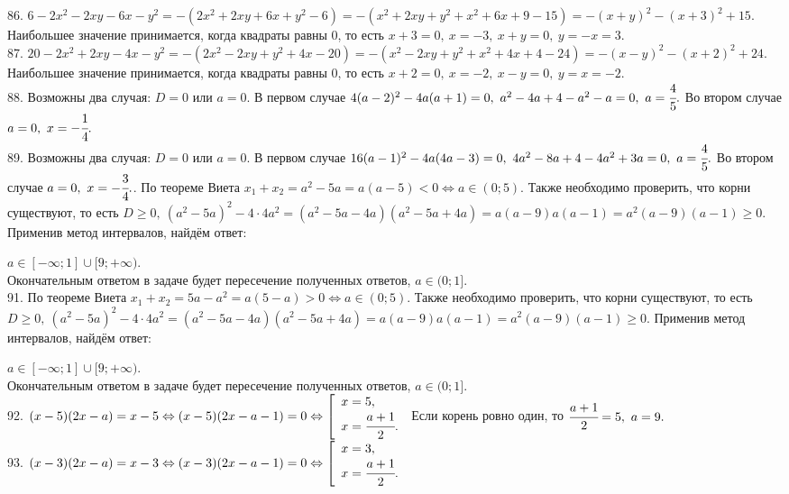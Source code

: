 86. $6-2x^2-2xy-6x-y^2=-(2x^2+2xy+6x+y^2-6)=-(x^2+2xy+y^2+x^2+6x+9-15)=-(x+y)^2-(x+3)^2+15.$ Наибольшее значение принимается, когда квадраты равны 0, то есть $x+3=0,\ x=-3,\ x+y=0,\ y=-x=3.$\\
87. $20-2x^2+2xy-4x-y^2=-(2x^2-2xy+y^2+4x-20)=-(x^2-2xy+y^2+x^2+4x+4-24)=-(x-y)^2-(x+2)^2+24.$ Наибольшее значение принимается, когда квадраты равны 0, то есть $x+2=0,\ x=-2,\ x-y=0,\ y=x=-2.$\\
88. Возможны два случая: $D=0$ или $a=0.$ В первом случае $4(a-2)^2-4a(a+1)=0,\ a^2-4a+4-a^2-a=0,\ a=\cfrac{4}{5}.$ Во втором случае $a=0,\ x=-\cfrac{1}{4}.$\\
89. Возможны два случая: $D=0$ или $a=0.$ В первом случае $16(a-1)^2-4a(4a-3)=0,\ 4a^2-8a+4-4a^2+3a=0,\ a=\cfrac{4}{5}.$ Во втором случае $a=0,\ x=-\cfrac{3}{4}.$\newpage{}. По теореме Виета $x_1+x_2=a^2-5a=a(a-5)<0\Leftrightarrow a\in(0;5).$ Также необходимо проверить, что корни существуют, то есть $D\geqslant0,\ (a^2-5a)^2-4\cdot4a^2=(a^2-5a-4a)(a^2-5a+4a)=a(a-9)a(a-1)=a^2(a-9)(a-1)\geqslant0.$ Применив метод интервалов, найдём ответ:
\begin{figure}[ht!]
\end{figure}
$a\in[-\infty;1]\cup[9;+\infty).$\\ Окончательным ответом в задаче будет пересечение полученных ответов, $a\in (0;1].$\\
91. По теореме Виета $x_1+x_2=5a-a^2=a(5-a)>0\Leftrightarrow a\in(0;5).$ Также необходимо проверить, что корни существуют, то есть $D\geqslant0,\ (a^2-5a)^2-4\cdot4a^2=(a^2-5a-4a)(a^2-5a+4a)=a(a-9)a(a-1)=a^2(a-9)(a-1)\geqslant0.$ Применив метод интервалов, найдём ответ:
\begin{figure}[ht!]
\end{figure}
$a\in[-\infty;1]\cup[9;+\infty).$\\ Окончательным ответом в задаче будет пересечение полученных ответов, $a\in (0;1].$\\
92. $(x-5)(2x-a)=x-5\Leftrightarrow(x-5)(2x-a-1)=0\Leftrightarrow \left[\begin{array}{l}x=5,\\ x=\cfrac{a+1}{2}.\end{array}\right.$
Если корень ровно один, то $\cfrac{a+1}{2}=5,\ a=9.$\\
93. $(x-3)(2x-a)=x-3\Leftrightarrow(x-3)(2x-a-1)=0\Leftrightarrow \left[\begin{array}{l}x=3,\\ x=\cfrac{a+1}{2}.\end{array}\right.$
